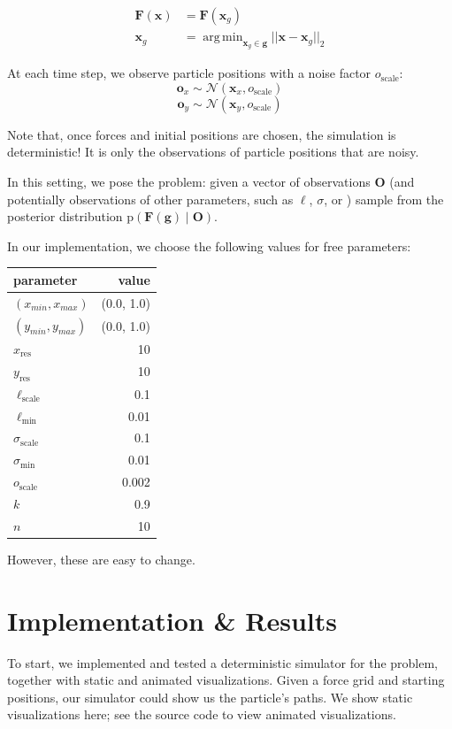 \documentclass[11pt]{article}
\DeclareMathOperator*{\argmin}{arg\,min}
\newcommand{\prob}[0]{\mathrm{p}}
\newcommand{\samples}[0]{\sim}
\newcommand{\given}[0]{\;|\;}
\newcommand{\xv}[0]{\mathbf{x}}
\newcommand{\Fv}[0]{\mathbf{F}}
\newcommand{\xres}[0]{x_{\mathrm{res}}}
\newcommand{\yres}[0]{y_{\mathrm{res}}}
\newcommand{\gv}[0]{\mathbf{g}}
\newcommand{\ov}[0]{\mathbf{o}}
\newcommand{\Ov}[0]{\mathbf{O}}
\newcommand{\scale}[0]{\mathrm{scale}}
\begin{document}
\begin{align*}
\Fv(\xv) &= \Fv(\xv_g) \\
\xv_g &= \argmin_{\xv_g \in \gv} ||\xv - \xv_g||_2
\end{align*}

At each time step, we observe particle positions with a noise factor \(o_{\scale}\):
$$\ov_x \samples \mathcal{N}(\xv_x, o_{\scale})$$
$$\ov_y \samples \mathcal{N}(\xv_y, o_{\scale})$$

Note that, once forces and initial positions are chosen, the simulation is deterministic! It is only the observations of particle positions that are noisy.

In this setting, we pose the problem: given a vector of observations \(\Ov\) (and potentially observations of other parameters, such as \(\ell\), \(\sigma\), or ) sample from the posterior distribution \(\prob(\Fv(\gv) \given \Ov)\).

In our implementation, we choose the following values for free parameters:

\begin{center}
\begin{tabular}{lr}
parameter & value\\
\hline
\((x_{min}, x_{max}) \)  & (0.0, 1.0) \\
\((y_{min}, y_{max}) \)  & (0.0, 1.0) \\
\(\xres              \)  &         10 \\
\(\yres              \)  &         10 \\
\(\ell_{\scale}      \)  &        0.1 \\
\(\ell_{\min}        \)  &       0.01 \\
\(\sigma_{\scale}    \)  &        0.1 \\
\(\sigma_{\min}      \)  &       0.01 \\
\(o_{\scale}         \)  &      0.002 \\
\(k\) & 0.9 \\
\(n\) & 10 \\
\end{tabular}
\end{center}

However, these are easy to change.

\section{Implementation \& Results}
\label{sec:orgaf00653}
To start, we implemented and tested a deterministic simulator for the problem, together with static and animated visualizations. Given a force grid and starting positions, our simulator could show us the particle's paths. We show static visualizations here; see the source code to view animated visualizations.
\end{document}
